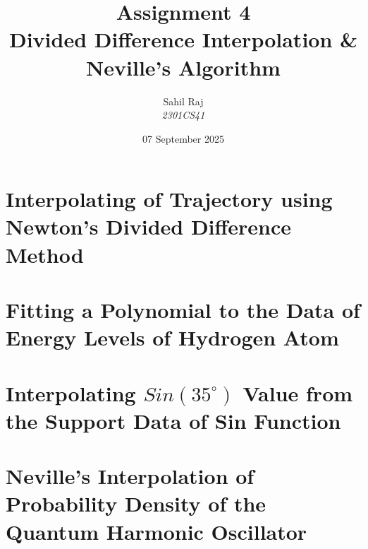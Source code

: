 \documentclass[12pt,a4paper]{report}
\title{\textbf{Assignment 4}\\Divided Difference Interpolation \& Neville's Algorithm}
\author{Sahil Raj\\\textit{2301CS41}}
\date{07 September 2025}
\begin{document}
\maketitle
\tableofcontents
\clearpage

\chapter{Interpolating of Trajectory using Newton's Divided Difference Method}

\pagebreak
\chapter{Fitting a Polynomial to the Data of Energy Levels of Hydrogen Atom}

\pagebreak
\chapter{Interpolating $Sin(35^{\circ})$ Value from the Support Data of Sin Function}

\chapter{Neville’s Interpolation of Probability Density of the Quantum Harmonic Oscillator}

\end{document}
